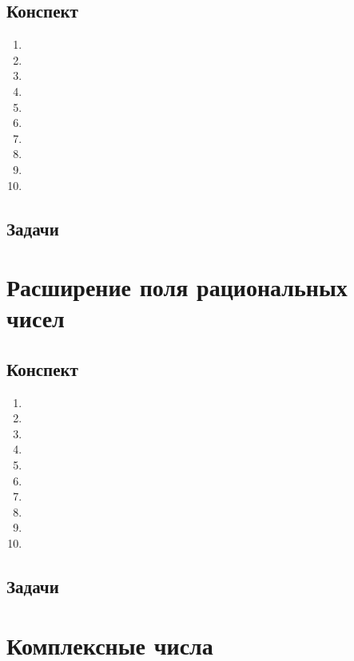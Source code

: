 \subsection{Конспект}
\begin{enumerate}\setlength{\itemsep}{1pt}
\item 
\item 
\item 
\item 
\item 
\item 
\item 
\item 
\item 
\item 
\end{enumerate}
\subsection{Задачи}



\section{Расширение поля рациональных чисел}

\subsection{Конспект}
\begin{enumerate}\setlength{\itemsep}{1pt}
\item 
\item 
\item 
\item 
\item 
\item 
\item 
\item 
\item 
\item 
\end{enumerate}
\subsection{Задачи}




\section{Комплексные числа}

